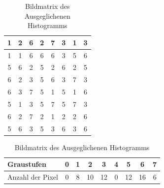 \begin{table}[htb]
  \caption{Bildmatrix des Ausgeglichenen Histogramms}
  \label{tab:b1}
  \centering
  \begin{minipage}{\textwidth}
  \center
  \begin{tabular}{|c|c|c|c|c|c|c|c|}
  \hline
  1&2&6&2&7&3&1&3\\
  \hline
  1&1&6&6&6&3&5&6\\
  \hline
  5&6&2&5&2&6&2&5\\
  \hline
  6&2&3&5&6&3&7&3\\
  \hline
  6&3&7&5&1&5&1&6\\
  \hline
  5&1&3&5&7&5&7&3\\
  \hline
  6&2&7&2&1&2&2&6\\
  \hline
  5&6&3&5&3&6&3&6\\
  \hline
  \end{tabular}
  \end{minipage}
  \begin{minipage}{\textwidth}
  \hspace{\textwidth}
  \end{minipage}
  \begin{minipage}{\textwidth}
  \center
  \begin{tabular}{|l|c|c|c|c|c|c|c|c|}
  \hline
  Graustufen & 0 & 1 & 2 & 3 & 4 & 5 & 6 & 7\\
  \hline
  Anzahl der Pixel & 0 & 8 & 10 & 12 & 0 & 12 & 16 & 6\\
  \hline
  \end{tabular}
  \end{minipage}
  \end{table}
  \newpage
